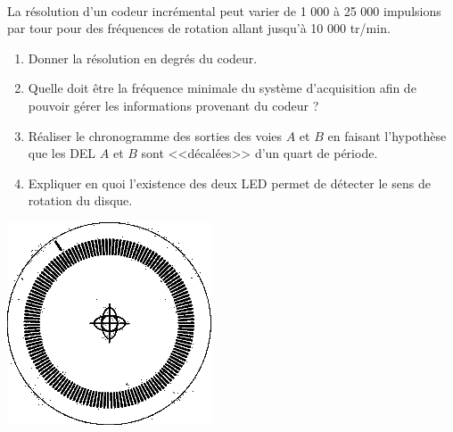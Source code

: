 \begin{exemple} ~\\

\begin{minipage}[c]{.75\linewidth}

La résolution d'un codeur incrémental peut varier de 1 000 à 25 000 impulsions par tour pour des fréquences de rotation allant jusqu'à 10 000 tr/min.
\begin{enumerate}
\item Donner la résolution en degrés du codeur. 
\item Quelle doit être la fréquence minimale du système d'acquisition afin de pouvoir gérer les informations provenant du codeur ?
\item Réaliser le chronogramme des sorties des voies $A$ et $B$ en faisant l'hypothèse que les DEL $A$ et $B$ sont <<décalées>> d'un quart de période.
\item Expliquer en quoi l'existence des deux LED permet de détecter le sens de rotation du disque. 
\end{enumerate}
\end{minipage}\hfill
\begin{minipage}[c]{.2\linewidth}
\begin{center}
\includegraphics[width=.95\textwidth]{images/DisqueIncremental}
\end{center}
\end{minipage}


\end{exemple}
